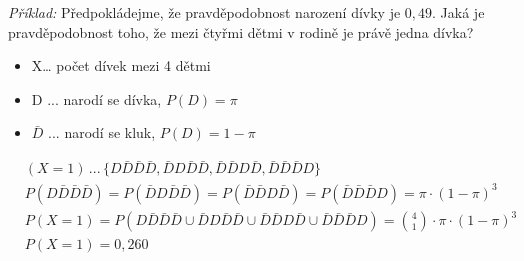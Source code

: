 \textit{Příklad:} Předpokládejme, že pravděpodobnost narození dívky je $0,49$. Jaká je pravděpodobnost toho, že mezi čtyřmi dětmi v rodině je právě jedna dívka?
\begin{itemize}
    \item X… počet dívek mezi 4 dětmi
    \item D ... narodí se dívka, $P(D) = \pi$
    \item $\bar{D}$ ...  narodí se kluk, $P(D) = 1 - \pi$
\end{itemize}
\begin{equation*}
    \begin{split}
        &(X = 1) \,... \, \{D\bar{D}\bar{D}\bar{D},\bar{D}D\bar{D}\bar{D},\bar{D}\bar{D}D\bar{D},\bar{D}\bar{D}\bar{D}D\} \\
        &P(D\bar{D}\bar{D}\bar{D}) = P(\bar{D}D\bar{D}\bar{D}) = P(\bar{D}\bar{D}D\bar{D}) = P(\bar{D}\bar{D}\bar{D}D) = \pi \cdot (1 - \pi)^3 \\
        &P(X = 1) = P(D\bar{D}\bar{D}\bar{D} \cup \bar{D}D\bar{D}\bar{D} \cup \bar{D}\bar{D}D\bar{D} \cup \bar{D}\bar{D}\bar{D}D) = \binom{4}{1} \cdot \pi \cdot (1 - \pi)^3 \\
        &P(X = 1) = 0,260
    \end{split}
\end{equation*}

